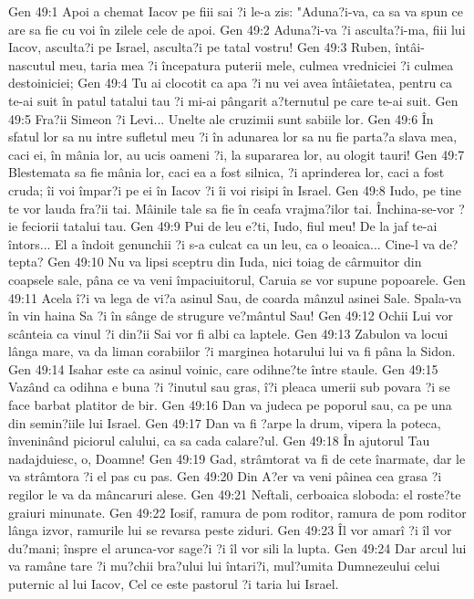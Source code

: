 Gen 49:1  Apoi a chemat Iacov pe fiii sai ?i le-a zis: "Aduna?i-va, ca sa va spun ce are sa fie cu voi în zilele cele de apoi.
Gen 49:2  Aduna?i-va ?i asculta?i-ma, fiii lui Iacov, asculta?i pe Israel, asculta?i pe tatal vostru!
Gen 49:3  Ruben, întâi-nascutul meu, taria mea ?i începatura puterii mele, culmea vredniciei ?i culmea destoiniciei;
Gen 49:4  Tu ai clocotit ca apa ?i nu vei avea întâietatea, pentru ca te-ai suit în patul tatalui tau ?i mi-ai pângarit a?ternutul pe care te-ai suit.
Gen 49:5  Fra?ii Simeon ?i Levi... Unelte ale cruzimii sunt sabiile lor.
Gen 49:6  În sfatul lor sa nu intre sufletul meu ?i în adunarea lor sa nu fie parta?a slava mea, caci ei, în mânia lor, au ucis oameni ?i, la supararea lor, au ologit tauri!
Gen 49:7  Blestemata sa fie mânia lor, caci ea a fost silnica, ?i aprinderea lor, caci a fost cruda; îi voi împar?i pe ei în Iacov ?i îi voi risipi în Israel.
Gen 49:8  Iudo, pe tine te vor lauda fra?ii tai. Mâinile tale sa fie în ceafa vrajma?ilor tai. Închina-se-vor ?ie feciorii tatalui tau.
Gen 49:9  Pui de leu e?ti, Iudo, fiul meu! De la jaf te-ai întors... El a îndoit genunchii ?i s-a culcat ca un leu, ca o leoaica... Cine-l va de?tepta?
Gen 49:10  Nu va lipsi sceptru din Iuda, nici toiag de cârmuitor din coapsele sale, pâna ce va veni împaciuitorul, Caruia se vor supune popoarele.
Gen 49:11  Acela î?i va lega de vi?a asinul Sau, de coarda mânzul asinei Sale. Spala-va în vin haina Sa ?i în sânge de strugure ve?mântul Sau!
Gen 49:12  Ochii Lui vor scânteia ca vinul ?i din?ii Sai vor fi albi ca laptele.
Gen 49:13  Zabulon va locui lânga mare, va da liman corabiilor ?i marginea hotarului lui va fi pâna la Sidon.
Gen 49:14  Isahar este ca asinul voinic, care odihne?te între staule.
Gen 49:15  Vazând ca odihna e buna ?i ?inutul sau gras, î?i pleaca umerii sub povara ?i se face barbat platitor de bir.
Gen 49:16  Dan va judeca pe poporul sau, ca pe una din semin?iile lui Israel.
Gen 49:17  Dan va fi ?arpe la drum, vipera la poteca, înveninând piciorul calului, ca sa cada calare?ul.
Gen 49:18  În ajutorul Tau nadajduiesc, o, Doamne!
Gen 49:19  Gad, strâmtorat va fi de cete înarmate, dar le va strâmtora ?i el pas cu pas.
Gen 49:20  Din A?er va veni pâinea cea grasa ?i regilor le va da mâncaruri alese.
Gen 49:21  Neftali, cerboaica sloboda: el roste?te graiuri minunate.
Gen 49:22  Iosif, ramura de pom roditor, ramura de pom roditor lânga izvor, ramurile lui se revarsa peste ziduri.
Gen 49:23  Îl vor amarî ?i îl vor du?mani; înspre el arunca-vor sage?i ?i îl vor sili la lupta.
Gen 49:24  Dar arcul lui va ramâne tare ?i mu?chii bra?ului lui întari?i, mul?umita Dumnezeului celui puternic al lui Iacov, Cel ce este pastorul ?i taria lui Israel.
